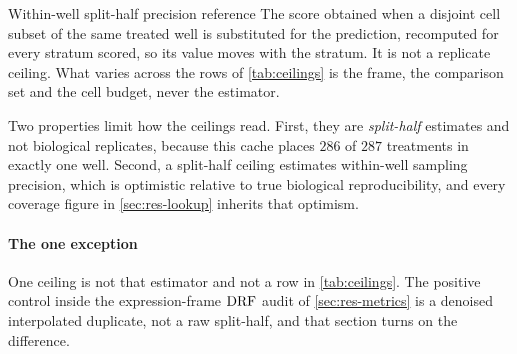 \begin{defn}{Within-well split-half precision reference}
The score obtained when a disjoint cell subset of the same treated well is
substituted for the prediction, recomputed for every stratum scored, so its
value moves with the stratum. It is not a replicate ceiling. What varies across
the rows of \cref{tab:ceilings} is the frame, the comparison set and the cell
budget, never the estimator.
\end{defn}

Two properties limit how the ceilings read. First, they are \emph{split-half}
estimates and not biological replicates, because this cache places $286$ of
$287$ treatments in exactly one well. Second, a split-half ceiling estimates
within-well sampling precision, which is optimistic relative to true biological
reproducibility, and every coverage figure in \cref{sec:res-lookup} inherits
that optimism.

\paragraph{The one exception} One ceiling is not that estimator and not a row in
\cref{tab:ceilings}. The positive control inside the expression-frame $\textrm{DRF}$
audit of \cref{sec:res-metrics} is a denoised interpolated duplicate, not a raw
split-half, and that section turns on the difference.

